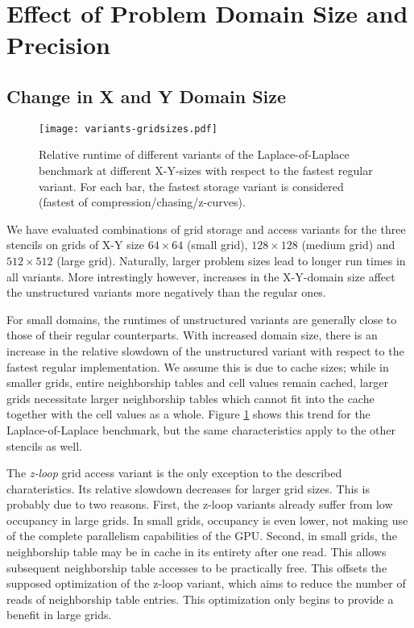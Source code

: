 \section{Effect of Problem Domain Size and Precision} \label{sec:res-size}

\subsection{Change in X and Y Domain Size}

\begin{figure}
	\texttt{[image: variants-gridsizes.pdf]}
	\caption{\label{fig:variants-gridsizes} Relative runtime of different variants of the Laplace-of-Laplace benchmark at different X-Y-sizes with respect to the fastest regular variant. For each bar, the fastest storage variant is considered (fastest of compression/chasing/z-curves).}
\end{figure}

We have evaluated combinations of grid storage and access variants for the three stencils on grids of X-Y size $64\times 64$ (small grid), $128\times 128$ (medium grid) and $512\times 512$ (large grid). Naturally, larger problem sizes lead to longer run times in all variants. More intrestingly however, increases in the X-Y-domain size affect the unstructured variants more negatively than the regular ones.

For small domains, the runtimes of unstructured variants are generally close to those of their regular counterparts. With increased domain size, there is an increase in the relative slowdown of the unstructured variant with respect to the fastest regular implementation. We assume this is due to cache sizes; while in smaller grids, entire neighborship tables and cell values remain cached, larger grids necessitate larger neighborship tables which cannot fit into the cache together with the cell values as a whole. Figure \ref{fig:variants-gridsizes} shows this trend for the Laplace-of-Laplace benchmark, but the same characteristics apply to the other stencils as well.

The \emph{z-loop} grid access variant is the only exception to the described charateristics. Its relative slowdown decreases for larger grid sizes. This is probably due to two reasons. First, the z-loop variants already suffer from low occupancy in large grids. In small grids, occupancy is even lower, not making use of the complete parallelism capabilities of the GPU. Second, in small grids, the neighborship table may be in cache in its entirety after one read. This allows subsequent neighborship table accesses to be practically free. This offsets the supposed optimization of the z-loop variant, which aims to reduce the number of reads of neighborship table entries. This optimization only begins to provide a benefit in large grids.

